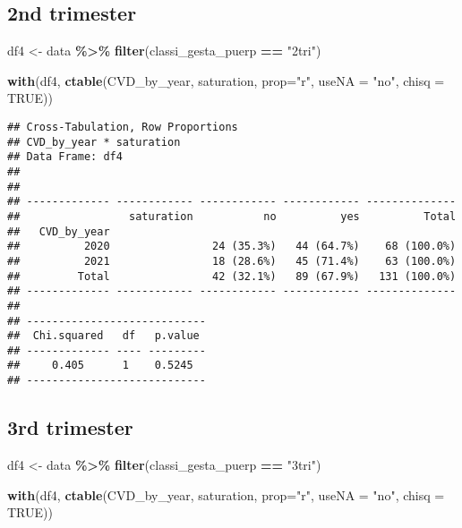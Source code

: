 \documentclass[
]{article}
\newenvironment{Shaded}{\begin{snugshade}}{\end{snugshade}}
\newcommand{\AttributeTok}[1]{\textcolor[rgb]{0.13,0.29,0.53}{#1}}
\newcommand{\ConstantTok}[1]{\textcolor[rgb]{0.56,0.35,0.01}{#1}}
\newcommand{\FunctionTok}[1]{\textcolor[rgb]{0.13,0.29,0.53}{\textbf{#1}}}
\newcommand{\NormalTok}[1]{#1}
\newcommand{\OtherTok}[1]{\textcolor[rgb]{0.56,0.35,0.01}{#1}}
\newcommand{\SpecialCharTok}[1]{\textcolor[rgb]{0.81,0.36,0.00}{\textbf{#1}}}
\newcommand{\StringTok}[1]{\textcolor[rgb]{0.31,0.60,0.02}{#1}}
\begin{document}
\hypertarget{nd-trimester-2}{%
\subsection{2nd trimester}\label{nd-trimester-2}}

\begin{Shaded}
\begin{Highlighting}[]
\NormalTok{df4 }\OtherTok{\textless{}{-}}\NormalTok{ data }\SpecialCharTok{\%\textgreater{}\%} 
  \FunctionTok{filter}\NormalTok{(classi\_gesta\_puerp }\SpecialCharTok{==} \StringTok{"2tri"}\NormalTok{)}

\FunctionTok{with}\NormalTok{(df4, }\FunctionTok{ctable}\NormalTok{(CVD\_by\_year, saturation, }\AttributeTok{prop=}\StringTok{"r"}\NormalTok{, }\AttributeTok{useNA =} \StringTok{"no"}\NormalTok{, }\AttributeTok{chisq =} \ConstantTok{TRUE}\NormalTok{))}
\end{Highlighting}
\end{Shaded}

\begin{verbatim}
## Cross-Tabulation, Row Proportions  
## CVD_by_year * saturation  
## Data Frame: df4  
## 
## 
## ------------- ------------ ------------ ------------ --------------
##                 saturation           no          yes          Total
##   CVD_by_year                                                      
##          2020                24 (35.3%)   44 (64.7%)    68 (100.0%)
##          2021                18 (28.6%)   45 (71.4%)    63 (100.0%)
##         Total                42 (32.1%)   89 (67.9%)   131 (100.0%)
## ------------- ------------ ------------ ------------ --------------
## 
## ----------------------------
##  Chi.squared   df   p.value 
## ------------- ---- ---------
##     0.405      1    0.5245  
## ----------------------------
\end{verbatim}

\hypertarget{rd-trimester-2}{%
\subsection{3rd trimester}\label{rd-trimester-2}}

\begin{Shaded}
\begin{Highlighting}[]
\NormalTok{df4 }\OtherTok{\textless{}{-}}\NormalTok{ data }\SpecialCharTok{\%\textgreater{}\%} 
  \FunctionTok{filter}\NormalTok{(classi\_gesta\_puerp }\SpecialCharTok{==} \StringTok{"3tri"}\NormalTok{)}

\FunctionTok{with}\NormalTok{(df4, }\FunctionTok{ctable}\NormalTok{(CVD\_by\_year, saturation, }\AttributeTok{prop=}\StringTok{"r"}\NormalTok{, }\AttributeTok{useNA =} \StringTok{"no"}\NormalTok{, }\AttributeTok{chisq =} \ConstantTok{TRUE}\NormalTok{))}
\end{Highlighting}
\end{Shaded}
\end{document}
